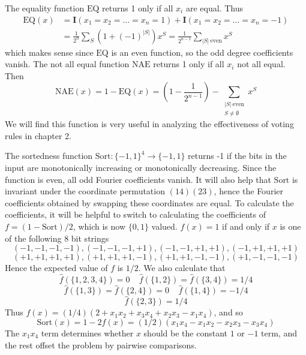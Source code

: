 \begin{example}
    The equality function $\text{EQ}$ returns 1 only if all $x_i$ are equal. Thus
    \begin{align*}
        \text{EQ}(x) &= \mathbf{I}(x_1 = x_2 = \dots = x_n = 1) + \mathbf{I}(x_1 = x_2 = \dots = x_n = -1)\\
        &= \frac{1}{2^n} \sum_S (1 + (-1)^{|S|}) x^S = \frac{1}{2^{n-1}} \sum_{|S|\ \text{even}} x^S
    \end{align*}
    which makes sense since $\text{EQ}$ is an even function, so the odd degree coefficients vanish. The not all equal function $\text{NAE}$ returns 1 only if all $x_i$ not all equal. Then
    \[ \text{NAE}(x) = 1 - \text{EQ}(x) = \left( 1 - \frac{1}{2^{n-1}} \right) - \sum_{\substack{|S|\ \text{even}\\S \neq \emptyset}} x^S \]
    We will find this function is very useful in analyzing the effectiveness of voting rules in chapter 2.
\end{example}

\begin{example}
    The sortedness function $\text{Sort} : \{ -1, 1 \}^4 \to \{ -1, 1 \}$ returns -1 if the bits in the input are monotonically increasing or monotonically decreasing. Since the function is even, all odd Fourier coefficients vanish. It will also help that $\text{Sort}$ is invariant under the coordinate permutation $(1 4)(2 3)$, hence the Fourier coefficients obtained by swapping these coordinates are equal. To calculate the coefficients, it will be helpful to switch to calculating the coefficients of $f = (1 - \text{Sort})/2$, which is now $\{ 0, 1 \}$ valued. $f(x) = 1$ if and only if $x$ is one of the following 8 bit strings
    \[ (-1,-1,-1,-1), (-1,-1,-1,+1), (-1,-1,+1,+1), (-1,+1,+1,+1) \]
    \[ (+1,+1,+1,+1), (+1,+1,+1,-1), (+1,+1,-1,-1), (+1,-1,-1,-1) \]
    Hence the expected value of $f$ is $1/2$. We also calculate that
    \[ \widehat{f}(\{1,2,3,4\}) = 0\ \ \ \ \ \widehat{f}(\{1,2\}) = \widehat{f}(\{3,4\}) = 1/4 \]
    \[ \widehat{f}(\{ 1, 3 \}) = \widehat{f}(\{2,4\}) = 0\ \ \ \ \ \widehat{f}(\{1,4\}) = -1/4 \]
    \[ \widehat{f}(\{2,3\}) = 1/4 \]
    Thus $f(x) = (1/4)(2 + x_1x_2 + x_3x_4 + x_2x_3 - x_1x_4)$, and so
    \[ \text{Sort}(x) = 1 - 2f(x) = (1/2)(x_1x_4 - x_1x_2 - x_2x_3 - x_3x_4) \]
    The $x_1x_4$ term determines whether $x$ should be the constant $1$ or $-1$ term, and the rest offset the problem by pairwise comparisons.
\end{example}

